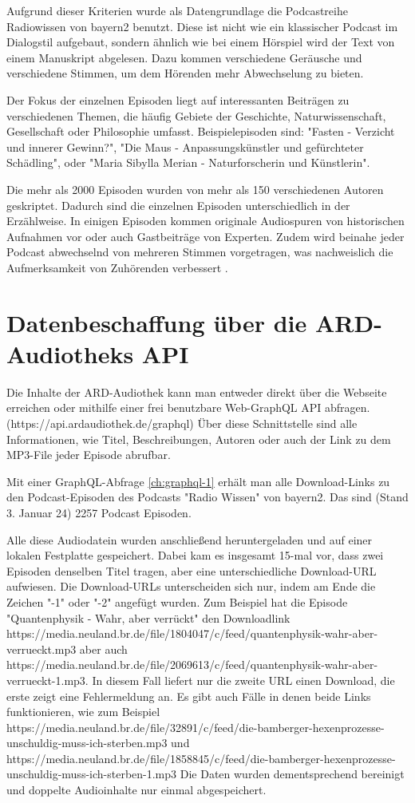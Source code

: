 Aufgrund dieser Kriterien wurde als Datengrundlage die Podcastreihe Radiowissen von bayern2 benutzt. 
Diese ist nicht wie ein klassischer Podcast im Dialogstil aufgebaut, sondern ähnlich wie bei einem Hörspiel wird der Text von einem Manuskript abgelesen. 
Dazu kommen verschiedene Geräusche und verschiedene Stimmen, um dem Hörenden mehr Abwechselung zu bieten.

Der Fokus der einzelnen Episoden liegt auf interessanten Beiträgen zu verschiedenen Themen, die häufig Gebiete der Geschichte, Naturwissenschaft, Gesellschaft oder Philosophie umfasst.
Beispielepisoden sind: "Fasten - Verzicht und innerer Gewinn?", "Die Maus - Anpassungskünstler und gefürchteter Schädling", oder "Maria Sibylla Merian - Naturforscherin und Künstlerin".

Die mehr als 2000 Episoden wurden von mehr als 150 verschiedenen Autoren geskriptet.
Dadurch sind die einzelnen Episoden unterschiedlich in der Erzählweise.
In einigen Episoden kommen originale Audiospuren von historischen Aufnahmen vor oder auch  Gastbeiträge von Experten. Zudem wird beinahe jeder Podcast abwechselnd von mehreren Stimmen vorgetragen, was nachweislich die Aufmerksamkeit von Zuhörenden verbessert \cite{kang2012}.

\section{Datenbeschaffung über die ARD-Audiotheks API}

Die Inhalte der ARD-Audiothek kann man entweder direkt über die Webseite erreichen oder mithilfe einer frei benutzbare Web-GraphQL API abfragen.
(https://api.ardaudiothek.de/graphql) 
Über diese Schnittstelle sind alle Informationen, wie Titel, Beschreibungen, Autoren oder auch der Link zu dem MP3-File jeder Episode abrufbar.

Mit einer GraphQL-Abfrage \autoref{ch:graphql-1} erhält man alle Download-Links zu den Podcast-Episoden des Podcasts "Radio Wissen" von bayern2.
Das sind (Stand 3. Januar 24) 2257 Podcast Episoden.

Alle diese Audiodatein wurden anschließend heruntergeladen und auf einer lokalen Festplatte gespeichert.
Dabei kam es insgesamt 15-mal vor, dass zwei Episoden denselben Titel tragen, aber eine unterschiedliche Download-URL aufwiesen.
Die Download-URLs unterscheiden sich nur, indem am Ende die Zeichen "-1" oder "-2" angefügt wurden.
Zum Beispiel hat die Episode "Quantenphysik - Wahr, aber verrückt" den Downloadlink https://media.neuland.br.de/file/1804047/c/feed/quantenphysik-wahr-aber-verrueckt.mp3 aber auch https://media.neuland.br.de/file/2069613/c/feed/quantenphysik-wahr-aber-verrueckt-1.mp3.
In diesem Fall liefert nur die zweite URL einen Download, die erste zeigt eine Fehlermeldung an.
Es gibt auch Fälle in denen beide Links funktionieren, wie zum Beispiel 
https://media.neuland.br.de/file/32891/c/feed/die-bamberger-hexenprozesse-unschuldig-muss-ich-sterben.mp3 und
https://media.neuland.br.de/file/1858845/c/feed/die-bamberger-hexenprozesse-unschuldig-muss-ich-sterben-1.mp3   
Die Daten wurden dementsprechend bereinigt und doppelte Audioinhalte nur einmal abgespeichert.

